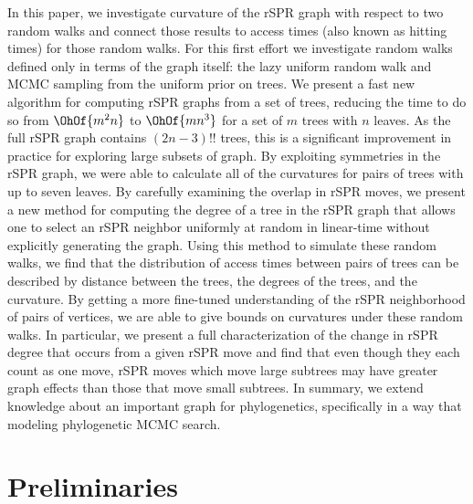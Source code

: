 \documentclass[11pt,onecolumn,conference]{IEEEtran}
\begin{document}
In this paper, we investigate curvature of the rSPR graph with respect to two random walks and connect those results to access times (also known as hitting times) for those random walks.
For this first effort we investigate random walks defined only in terms of the graph itself: the lazy uniform random walk and MCMC sampling from the uniform prior on trees.
We present a fast new algorithm for computing rSPR graphs from a set of trees, reducing the time to do so from $\OhOf{m^2n}$ to $\OhOf{mn^3}$ for a set of $m$ trees with $n$ leaves.
As the full rSPR graph contains $(2n-3)!!$ trees, this is a significant improvement in practice for exploring large subsets of graph.
By exploiting symmetries in the rSPR graph, we were able to calculate all of the curvatures for pairs of trees with up to seven leaves.
By carefully examining the overlap in rSPR moves, we present a new method for computing the degree of a tree in the rSPR graph that allows one to select an rSPR neighbor uniformly at random in linear-time without explicitly generating the graph.
Using this method to simulate these random walks, we find that the distribution of access times between pairs of trees can be described by distance between the trees, the degrees of the trees, and the curvature.
By getting a more fine-tuned understanding of the rSPR neighborhood of pairs of vertices, we are able to give bounds on curvatures under these random walks.
In particular, we present a full characterization of the change in rSPR degree that occurs from a given rSPR move and find that even though they each count as one move, rSPR moves which move large subtrees may have greater graph effects than those that move small subtrees.
In summary, we extend knowledge about an important graph for phylogenetics, specifically in a way that modeling phylogenetic MCMC search.

\section{Preliminaries}
\end{document}

